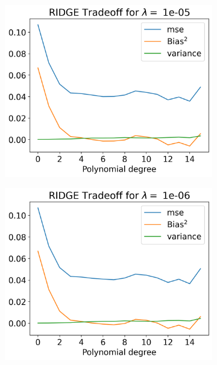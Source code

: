 \documentclass[12pt]{article}
\begin{document}
\begin{figure}[H]
\begin{subfigure}{.5\textwidth}
    \caption{}
    \label{fig:}
  \end{subfigure}
  \begin{subfigure}{.5\textwidth}
    \centering
    \includegraphics[width=\textwidth]{../figures/tradeoff_RIDGE_1e-05.png}
    \caption{}
    \label{fig:}
  \end{subfigure}
  \begin{subfigure}{.5\textwidth}
    \centering
    \includegraphics[width=\textwidth]{../figures/tradeoff_RIDGE_1e-06.png}
    \caption{}
    \label{fig:}
  \end{subfigure}

\end{figure}
\end{document}
